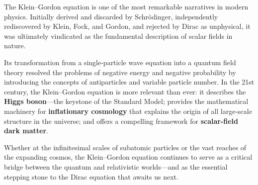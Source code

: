 \documentclass[12pt, a4paper]{article}
\theoremstyle{definition}
\begin{document}
\bigskip

The Klein--Gordon equation is one of the most remarkable narratives in modern
physics.  Initially derived and discarded by Schr\"{o}dinger, independently
rediscovered by Klein, Fock, and Gordon, and rejected by Dirac as
unphysical, it was ultimately vindicated as the fundamental description of
scalar fields in nature.

Its transformation from a single-particle wave equation into a quantum field
theory resolved the problems of negative energy and negative probability by
introducing the concepts of antiparticles and variable particle number.  In
the 21st century, the Klein--Gordon equation is more relevant than ever: it
describes the \textbf{Higgs boson}---the keystone of the Standard Model;
provides the mathematical machinery for \textbf{inflationary cosmology} that
explains the origin of all large-scale structure in the universe; and offers a
compelling framework for \textbf{scalar-field dark matter}.

Whether at the infinitesimal scales of subatomic particles or the vast reaches
of the expanding cosmos, the Klein--Gordon equation continues to serve as a
critical bridge between the quantum and relativistic worlds---and as the
essential stepping stone to the Dirac equation that awaits us next.

\end{document}
